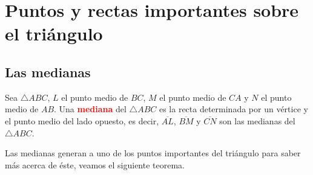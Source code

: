 \section{Puntos y rectas importantes sobre el triángulo}
\subsection{Las medianas}
\begin{df}
Sea $\triangle ABC$, $L$ el punto medio de $BC$, $M$ el punto medio de $CA$ y $N$ el punto medio de $AB$.
Una \textcolor{red}{\bf mediana} del $\triangle ABC$ es la recta determinada por un vértice y el punto medio del lado opuesto, es decir, $\overline{AL}$, $\overline{BM}$ y $\overline{CN}$ son las medianas del $\triangle ABC$.
\end{df}

Las medianas generan a uno de los puntos importantes del triángulo para saber más acerca de éste, veamos el siguiente teorema. 

